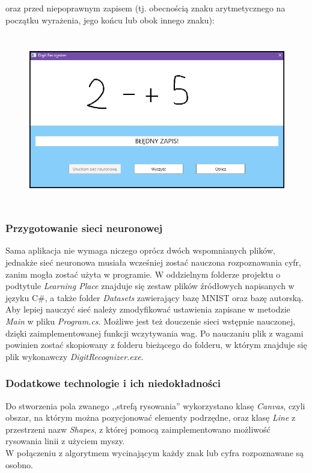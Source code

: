 \documentclass[12pt,a4paper]{article}
\begin{document}
    \noindent oraz przed niepoprawnym zapisem (tj. obecnością znaku arytmetycznego na początku wyrażenia, jego końcu lub obok innego znaku):
    
    \begin{figure}[h!]
	\centering
	\includegraphics[height=7.5cm]{graphics/app5.png}
	\end{figure}
\subsubsection*{Przygotowanie sieci neuronowej}
    \hspace{20pt}Sama aplikacja nie wymaga niczego oprócz dwóch wspomnianych plików, jednakże sieć neuronowa musiała wcześniej zostać nauczona rozpoznawania cyfr, zanim mogła zostać użyta w programie. W oddzielnym folderze projektu o podtytule \textit{Learning Place} znajduje się zestaw plików źródłowych napisanych w języku C\#, a także folder \textit{Datasets} zawierający bazę MNIST oraz bazę autorską. Aby lepiej nauczyć sieć należy zmodyfikować ustawienia zapisane w metodzie \textit{Main} w pliku \textit{Program.cs}. Możliwe jest też douczenie sieci wstępnie nauczonej, dzięki zaimplementowanej funkcji wczytywania wag. Po nauczaniu plik z wagami powinien zostać skopiowany z folderu bieżącego do folderu, w którym znajduje się plik wykonawczy \textit{DigitRecognizer.exe}.
\subsubsection*{Dodatkowe technologie i ich niedokładności}
	\hspace{20pt}Do stworzenia pola zwanego ,,strefą rysowania'' wykorzystano klasę \textit{Canvas}, czyli obszar, na którym można pozycjonować elementy podrzędne, oraz klasę \textit{Line} z przestrzeni nazw \textit{Shapes}, z której pomocą zaimplementowano możliwość rysowania linii z użyciem myszy. \\W połączeniu z algorytmem wycinającym każdy znak lub cyfra rozpoznawane są osobno.
	
\end{document}
